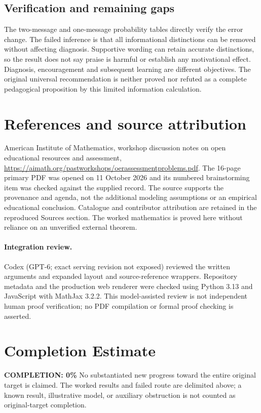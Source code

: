 \documentclass[11pt]{article}
\begin{document}
\subsection{Verification and remaining gaps}
The two-message and one-message probability tables directly verify the error change. The failed inference is that all informational distinctions can be removed without affecting diagnosis. Supportive wording can retain accurate distinctions, so the result does not say praise is harmful or establish any motivational effect. Diagnosis, encouragement and subsequent learning are different objectives. The original universal recommendation is neither proved nor refuted as a complete pedagogical proposition by this limited information calculation.

\section{References and source attribution}
American Institute of Mathematics, workshop discussion notes on open educational resources and assessment, \url{https://aimath.org/pastworkshops/oerassessmentproblems.pdf}. The 16-page primary PDF was opened on 11 October 2026 and its numbered brainstorming item was checked against the supplied record. The source supports the provenance and agenda, not the additional modeling assumptions or an empirical educational conclusion. Catalogue and contributor attribution are retained in the reproduced Sources section. The worked mathematics is proved here without reliance on an unverified external theorem.


\paragraph{Integration review.} Codex (GPT-6; exact serving revision not exposed) reviewed the written arguments and expanded layout and source-reference wrappers. Repository metadata and the production web renderer were checked using Python 3.13 and JavaScript with MathJax 3.2.2. This model-assisted review is not independent human proof verification; no PDF compilation or formal proof checking is asserted.

\section{Completion Estimate}
\noindent\textbf{COMPLETION: 0\%}
No substantiated new progress toward the entire original target is claimed. The worked results and failed route are delimited above; a known result, illustrative model, or auxiliary obstruction is not counted as original-target completion.
\end{document}
